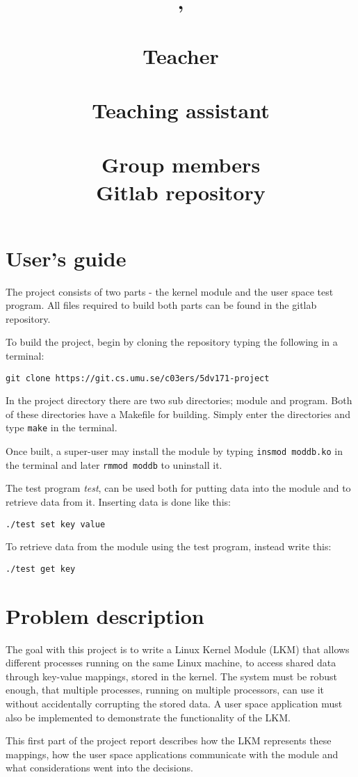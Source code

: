 \documentclass[final,a4paper]{article}
\title{
  \vspace{4em}
  \pagenumbering{gobble}
  \begin{center}
  {\LARGE \bf \course{}, \semester}\\
  {\Large \bf \assignment}\\
  \vspace{6em}
  {\normalsize
  {\bf Teacher}\\
  {\lecturer}\vspace{1em}\\
  {\bf Teaching assistant}\\
  {\assistants}\vspace{1em}\\
  {\bf Group members}\\
  \authors
  {\bf Gitlab repository}\vspace{-1em}\\
  {\codebase}}
  \end{center}
}
\author{}
\date{}
\newcommand{\codebase}{https://git.cs.umu.se/c03ers/5dv171-project}
\begin{document}
\maketitle
\pagebreak
{}

\section*{User's guide}
The project consists of two parts - the kernel module and the user space
test program. All files required to build both parts can be found in the gitlab
repository.

To build the project, begin by cloning the repository typing the following in
a terminal:
\begin{center}
{\tt git clone \codebase}
\end{center}
In the project directory there are two sub directories; module and program.
Both of these directories have a Makefile for building. Simply enter the
directories and type {\tt make} in the terminal.

Once built, a super-user may install the module by typing 
{\tt insmod moddb.ko} in the terminal and later {\tt rmmod moddb}
to uninstall it.

The test program \emph{test}, can be used both for putting data
into the module and to retrieve data from it. Inserting data is done like this:
\begin{center}
{\tt ./test set key value}
\end{center}
To retrieve data from the module using the test program, instead write this:
\begin{center}
{\tt ./test get key}
\end{center}

\section*{Problem description}
The goal with this project is to write a Linux Kernel Module (LKM) that allows
different processes running on the same Linux machine, to access shared data
through key-value mappings, stored in the kernel. The system must be robust
enough, that multiple processes, running on multiple processors, can use it
without accidentally corrupting the stored data. A user space application must
also be implemented to demonstrate the functionality of the LKM.

This first part of the project report describes how the LKM represents these
mappings, how the user space applications communicate with the module and
what considerations went into the decisions.\pagebreak
\end{document}
